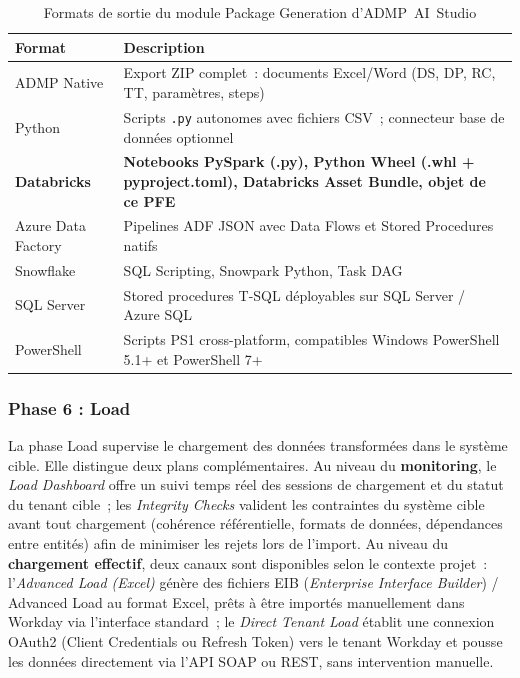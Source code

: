 \begin{table}[H]
\centering
\caption{Formats de sortie du module Package Generation d'ADMP~AI~Studio}
\label{tab:admp-formats}
\begin{tabularx}{\textwidth}{lX}
\toprule
\textbf{Format} & \textbf{Description} \\
\midrule
ADMP Native &
  Export ZIP complet~: documents Excel/Word (DS, DP, RC, TT, paramètres, steps) \\
\addlinespace
Python &
  Scripts \texttt{.py} autonomes avec fichiers CSV~; connecteur base de données optionnel \\
\addlinespace
\textbf{Databricks} &
  \textbf{Notebooks PySpark (.py), Python Wheel (.whl + pyproject.toml), Databricks Asset Bundle, objet de ce PFE} \\
\addlinespace
Azure Data Factory &
  Pipelines ADF JSON avec Data Flows et Stored Procedures natifs \\
\addlinespace
Snowflake &
  SQL Scripting, Snowpark Python, Task DAG \\
\addlinespace
SQL Server &
  Stored procedures T-SQL déployables sur SQL Server / Azure SQL \\
\addlinespace
PowerShell &
  Scripts PS1 cross-platform, compatibles Windows PowerShell 5.1+ et PowerShell 7+ \\
\bottomrule
\end{tabularx}
\end{table}

\subsubsection*{Phase 6 : Load}
\label{subsubsec:phase-load}

La phase Load supervise le chargement des données transformées dans le système cible. Elle distingue deux plans complémentaires. Au niveau du \textbf{monitoring}, le \textit{Load Dashboard} offre un suivi temps réel des sessions de chargement et du statut du tenant cible~; les \textit{Integrity Checks} valident les contraintes du système cible avant tout chargement (cohérence référentielle, formats de données, dépendances entre entités) afin de minimiser les rejets lors de l'import. Au niveau du \textbf{chargement effectif}, deux canaux sont disponibles selon le contexte projet~: l'\textit{Advanced Load (Excel)} génère des fichiers EIB (\textit{Enterprise Interface Builder}) / Advanced Load au format Excel, prêts à être importés manuellement dans Workday via l'interface standard~; le \textit{Direct Tenant Load} établit une connexion OAuth2 (Client Credentials ou Refresh Token) vers le tenant Workday et pousse les données directement via l'API SOAP ou REST, sans intervention manuelle.

